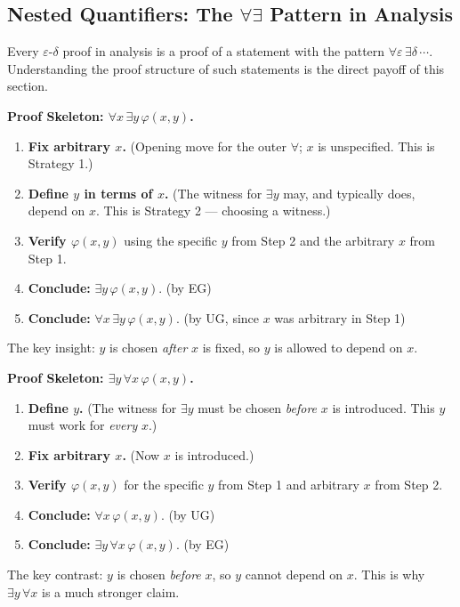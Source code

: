 
\subsection*{\texorpdfstring{Nested Quantifiers: The $\forall\exists$ Pattern in Analysis}{Nested Quantifiers: The forallexists Pattern in Analysis}}

\begin{exposition}
Every $\varepsilon$-$\delta$ proof in analysis is a proof of a statement with
the pattern $\forall\varepsilon\,\exists\delta\,\cdots$. Understanding the
proof structure of such statements is the direct payoff of this section.
\end{exposition}

\begin{remark*}[Exposition]
\textbf{Proof Skeleton: $\forall x\,\exists y\,\varphi(x,y)$.}
\begin{enumerate}[label=\textbf{Step \arabic*.}]
\item \textbf{Fix arbitrary $x$.} \quad (Opening move for the outer $\forall$; $x$ is
  unspecified. This is Strategy 1.)
\item \textbf{Define $y$ in terms of $x$.} \quad (The witness for $\exists y$ may, and
  typically does, depend on $x$. This is Strategy 2 --- choosing a witness.)
\item \textbf{Verify $\varphi(x,y)$} \quad using the specific $y$ from Step 2 and
  the arbitrary $x$ from Step 1.
\item \textbf{Conclude:} $\exists y\,\varphi(x,y)$. \quad (by EG)
\item \textbf{Conclude:} $\forall x\,\exists y\,\varphi(x,y)$. \quad (by UG, since $x$
  was arbitrary in Step 1)
\end{enumerate}
The key insight: $y$ is chosen \emph{after} $x$ is fixed, so $y$ is allowed
to depend on $x$.
\end{remark*}


\begin{remark*}[Exposition]
\textbf{Proof Skeleton: $\exists y\,\forall x\,\varphi(x,y)$.}
\begin{enumerate}[label=\textbf{Step \arabic*.}]
\item \textbf{Define $y$.} \quad (The witness for $\exists y$ must be chosen \emph{before}
  $x$ is introduced. This $y$ must work for \emph{every} $x$.)
\item \textbf{Fix arbitrary $x$.} \quad (Now $x$ is introduced.)
\item \textbf{Verify $\varphi(x,y)$} \quad for the specific $y$ from Step 1 and
  arbitrary $x$ from Step 2.
\item \textbf{Conclude:} $\forall x\,\varphi(x,y)$. \quad (by UG)
\item \textbf{Conclude:} $\exists y\,\forall x\,\varphi(x,y)$. \quad (by EG)
\end{enumerate}
The key contrast: $y$ is chosen \emph{before} $x$, so $y$ cannot depend on
$x$. This is why $\exists y\,\forall x$ is a much stronger claim.
\end{remark*}


